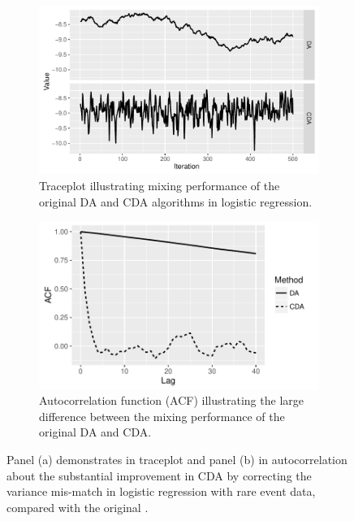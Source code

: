 \documentclass[10pt]{article}
\begin{document}
\begin{figure}[H]
  \begin{subfigure}[b]{0.49\textwidth}
 \includegraphics[width=1\textwidth]{logit_random_trace_plot.pdf}
  \caption{Traceplot illustrating mixing performance of the original DA and CDA algorithms in logistic regression.}
\end{subfigure}
  \hfill
   \begin{subfigure}[b]{0.49\textwidth}
 \includegraphics[width=1\textwidth]{logit_random_acf.pdf}
  \caption{Autocorrelation function (ACF) illustrating the large difference between the mixing performance of the original DA and CDA.}
\end{subfigure}
 \caption{Panel (a) demonstrates in traceplot and panel (b) in autocorrelation about the substantial improvement in CDA by correcting the variance mis-match in logistic regression with rare event data, compared with the original \citep{polson2013bayesian}.}
    \label{logit_random_mixing}
 \end{figure}
\end{document}
